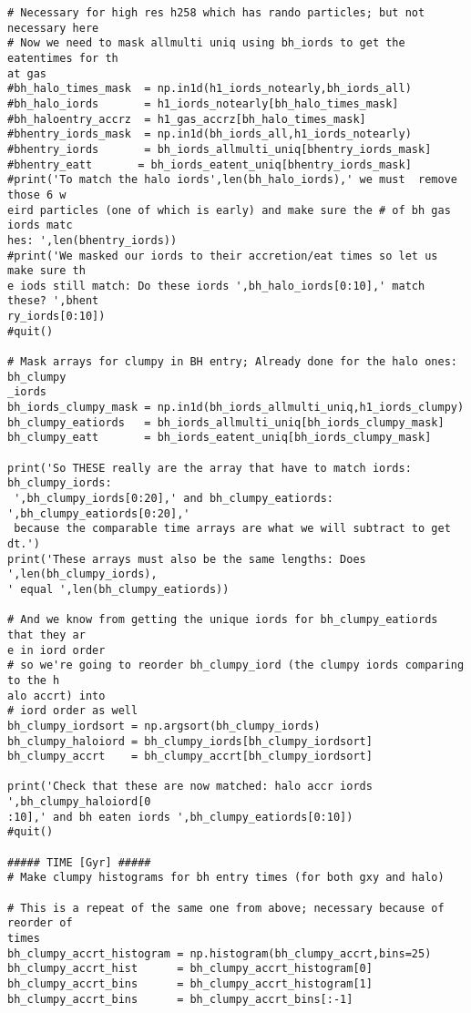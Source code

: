 \documentclass[12pt,headA,chapB]{fiskthesis}
\begin{document}
\begin{verbatim}
# Necessary for high res h258 which has rando particles; but not necessary here
# Now we need to mask allmulti uniq using bh_iords to get the eatentimes for th
at gas
#bh_halo_times_mask  = np.in1d(h1_iords_notearly,bh_iords_all)
#bh_halo_iords       = h1_iords_notearly[bh_halo_times_mask]
#bh_haloentry_accrz  = h1_gas_accrz[bh_halo_times_mask]
#bhentry_iords_mask  = np.in1d(bh_iords_all,h1_iords_notearly)
#bhentry_iords       = bh_iords_allmulti_uniq[bhentry_iords_mask]
#bhentry_eatt       = bh_iords_eatent_uniq[bhentry_iords_mask]
#print('To match the halo iords',len(bh_halo_iords),' we must  remove those 6 w
eird particles (one of which is early) and make sure the # of bh gas iords matc
hes: ',len(bhentry_iords))
#print('We masked our iords to their accretion/eat times so let us make sure th
e iods still match: Do these iords ',bh_halo_iords[0:10],' match these? ',bhent
ry_iords[0:10])
#quit()

# Mask arrays for clumpy in BH entry; Already done for the halo ones: bh_clumpy
_iords
bh_iords_clumpy_mask = np.in1d(bh_iords_allmulti_uniq,h1_iords_clumpy)
bh_clumpy_eatiords   = bh_iords_allmulti_uniq[bh_iords_clumpy_mask]
bh_clumpy_eatt       = bh_iords_eatent_uniq[bh_iords_clumpy_mask]

print('So THESE really are the array that have to match iords: bh_clumpy_iords:
 ',bh_clumpy_iords[0:20],' and bh_clumpy_eatiords: ',bh_clumpy_eatiords[0:20],'
 because the comparable time arrays are what we will subtract to get dt.')
print('These arrays must also be the same lengths: Does ',len(bh_clumpy_iords),
' equal ',len(bh_clumpy_eatiords))

# And we know from getting the unique iords for bh_clumpy_eatiords that they ar
e in iord order
# so we're going to reorder bh_clumpy_iord (the clumpy iords comparing to the h
alo accrt) into 
# iord order as well
bh_clumpy_iordsort = np.argsort(bh_clumpy_iords)
bh_clumpy_haloiord = bh_clumpy_iords[bh_clumpy_iordsort]
bh_clumpy_accrt    = bh_clumpy_accrt[bh_clumpy_iordsort]

print('Check that these are now matched: halo accr iords ',bh_clumpy_haloiord[0
:10],' and bh eaten iords ',bh_clumpy_eatiords[0:10])
#quit()

##### TIME [Gyr] #####
# Make clumpy histograms for bh entry times (for both gxy and halo)

# This is a repeat of the same one from above; necessary because of reorder of 
times 
bh_clumpy_accrt_histogram = np.histogram(bh_clumpy_accrt,bins=25)
bh_clumpy_accrt_hist      = bh_clumpy_accrt_histogram[0]
bh_clumpy_accrt_bins      = bh_clumpy_accrt_histogram[1]
bh_clumpy_accrt_bins      = bh_clumpy_accrt_bins[:-1]


\end{verbatim}
\end{document}
